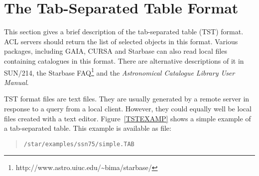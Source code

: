 \documentclass[twoside,11pt]{article}
\newcommand{\htmladdnormallinkfoot}[2]{#1\footnote{#2}}
\newcommand{\xref}[3]{#1}
\newcommand{\xlabel}[1]{}
\renewcommand{\_}{\texttt{\symbol{95}}}
\begin{document}
\section{\xlabel{TST_R}\label{TST_R}The Tab-Separated Table Format}

This section gives a brief description of the tab-separated table (TST)
format.  ACL servers should return the list of selected objects in this
format.  Various packages, including GAIA, CURSA and Starbase can also
read local files containing catalogues in this format.  There are
alternative descriptions of it in \xref{SUN/214}{sun214}{}\cite{SUN214},
the \htmladdnormallinkfoot{Starbase FAQ}
{http://www.astro.uiuc.edu/\~{}bima/starbase/}
and the {\it Astronomical Catalogue Library User Manual}\/\cite{BRIGHTON98}.

TST format files are text files.  They are usually generated by a remote
server in response to a query from a local client.  However, they could
equally well be local files created with a text editor.
Figure~\ref{TSTEXAMP} shows a simple example of a tab-separated table.
This example is available as file:

\begin{verse}
{\tt /star/examples/ssn75/simple.TAB}
\end{verse}
\end{document}
